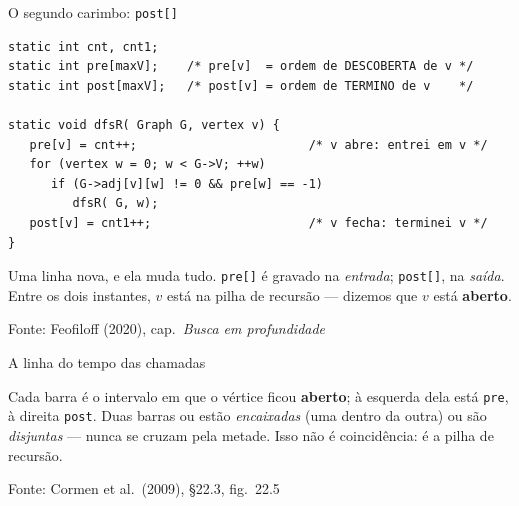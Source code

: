 \documentclass[aspectratio=169]{beamer}
\newcommand{\fonte}[1]{\vfill{\tiny\color{gray!60!black}Fonte: #1\par}}
\begin{document}
\begin{frame}[fragile]{O segundo carimbo: \texttt{post[]}}
\begin{lstlisting}
static int cnt, cnt1;
static int pre[maxV];    /* pre[v]  = ordem de DESCOBERTA de v */
static int post[maxV];   /* post[v] = ordem de TERMINO de v    */

static void dfsR( Graph G, vertex v) {
   pre[v] = cnt++;                        /* v abre: entrei em v */
   for (vertex w = 0; w < G->V; ++w)
      if (G->adj[v][w] != 0 && pre[w] == -1)
         dfsR( G, w);
   post[v] = cnt1++;                      /* v fecha: terminei v */
}
\end{lstlisting}
  {\scriptsize Uma linha nova, e ela muda tudo. \texttt{pre[]} é gravado na
  \emph{entrada}; \texttt{post[]}, na \emph{saída}. Entre os dois instantes, $v$
  está na pilha de recursão --- dizemos que $v$ está \textbf{aberto}.}
  \fonte{Feofiloff (2020), cap.\ \emph{Busca em profundidade}~\cite{feofiloff2020algoritmos}}
\end{frame}

\begin{frame}{A linha do tempo das chamadas}
  \begin{center}
  \end{center}
  {\scriptsize Cada barra é o intervalo em que o vértice ficou \textbf{aberto};
  à esquerda dela está \texttt{pre}, à direita \texttt{post}. Duas barras ou
  estão \emph{encaixadas} (uma dentro da outra) ou são \emph{disjuntas} --- nunca
  se cruzam pela metade. Isso não é coincidência: é a pilha de recursão.}
  \fonte{Cormen et al.\ (2009), \S 22.3, fig.\ 22.5~\cite{cormen2009introduction}}
\end{frame}
\end{document}
